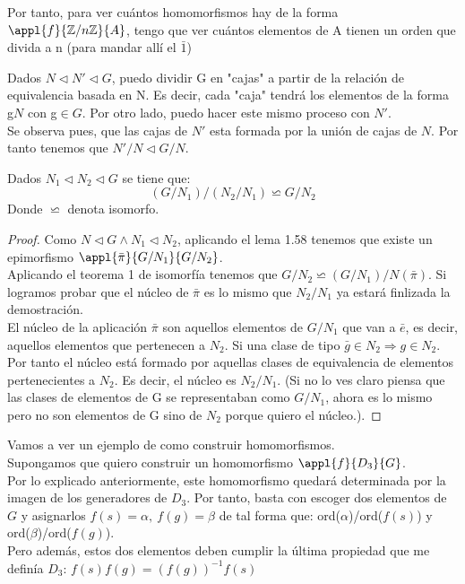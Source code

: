 \documentclass[nochap]{apuntes}
\begin{document}
Por tanto, para ver cuántos homomorfismos hay de la forma $\appl{f}{\mathbb{Z}/n\mathbb{Z}}{A}$, tengo que ver cuántos elementos
de A tienen un orden que divida a n (para mandar allí el $\bar{1}$)\\

\begin{lemma}
 Dados $N\vartriangleleft N' \vartriangleleft G$, puedo dividir G en "cajas" a partir de la relación de equivalencia basada en N. Es decir,
cada "caja" tendrá los elementos de la forma g$N$  con g$\in G$. Por otro lado, puedo hacer este mismo proceso con $N'$.\\
Se observa pues, que las cajas de $N'$  esta formada por la unión de cajas de $N$. Por tanto tenemos que $N'/N \vartriangleleft G/N$.\\
\end{lemma}

\begin{theorem}
 Dados $N_1\vartriangleleft N_2 \vartriangleleft G$  se tiene que:
 \[ (G/N_1)/(N_2/N_1)\backsimeq G/N_2\]
 Donde $\backsimeq$  denota isomorfo.
\end{theorem}

\begin{proof}
 Como $N\vartriangleleft G  \wedge  N_1 \lhd N_2$, aplicando el lema 1.58 tenemos que existe un epimorfismo $\appl{\bar{\pi}}{G/N_1}{G/N_2}$.\\
 Aplicando el teorema 1 de isomorfía tenemos que $G/N_2 \backsimeq (G/N_1)/N(\bar{\pi})$. Si logramos probar que el núcleo de $\bar{\pi}$ 
 es lo mismo que $N_2/N_1$  ya estará finlizada la demostración.\\
 El núcleo de la aplicación $\bar{\pi}$  son aquellos elementos de $G/N_1$  que van a $\bar{e}$, es decir, aquellos elementos que pertenecen a $N_2$.
 Si una clase de tipo $\bar{g}\in N_2 \Rightarrow g \in N_2$. Por tanto el núcleo está formado por aquellas clases de equivalencia de elementos pertenecientes a $N_2$.
 Es decir, el núcleo es $N_2/N_1$. (Si no lo ves claro piensa que las clases de elementos de G se representaban como $G/N_1$, ahora es lo mismo pero
 no son elementos de G sino de $N_2$  porque quiero el núcleo.).
\end{proof}

\begin{example}
 Vamos a ver un ejemplo de como construir homomorfismos.\\
 Supongamos que quiero construir un homomorfismo $\appl{f}{D_3}{G}$.\\
 Por lo explicado anteriormente, este homomorfismo quedará determinada por la imagen de los generadores de $D_3$. Por tanto,
 basta con escoger dos elementos de $G$  y asignarlos $f(s)=\alpha, \ f(g)=\beta$  de tal forma que: ord($\alpha$)/ord($f(s)$) y ord($\beta$)/ord($f(g)$).\\
 Pero además, estos dos elementos deben cumplir la última propiedad que me definía $D_3$: $f(s)f(g)=(f(g))^{-1}f(s)$
\end{example}
\end{document}
